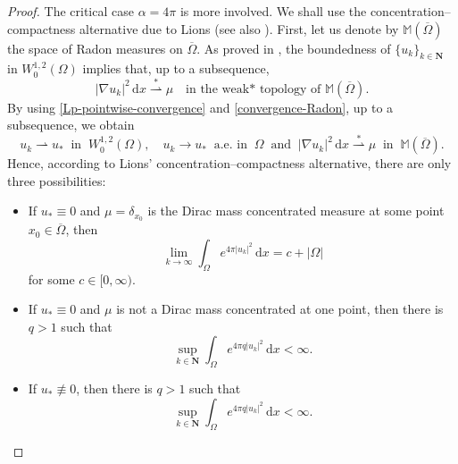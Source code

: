 \documentclass[reqno,11pt]{amsart}
\theoremstyle{definition}
\newcommand{\ud}{\,\mathrm{d}}
\begin{document}
\begin{proof}
      
    \noindent The critical case $\alpha=4\pi$ is more involved. We shall use the 
    concentration--compactness alternative due to Lions \cite{Lions85} (see also \cite{Cerny2013}). First, 
    let us denote by $\mathbb{M}(\overline{\Omega})$ the space of Radon measures on $\overline{\Omega}$.  
    As proved in \cite[Sec.~3, page~115]{MR2759829}, the boundedness of $\{u_k\}_{k\in\mathbf{N}}$ 
    in $W^{1,2}_0(\Omega)$ implies that, up to a subsequence, 
    \begin{equation}\label{convergence-Radon}
        |\nabla u_k|^2\ud x\overset{*}{\rightharpoonup} \mu \quad \text{in the weak* topology of  } 
        \mathbb{M}(\overline{\Omega}).
    \end{equation}
    By using \eqref{Lp-pointwise-convergence} and \eqref{convergence-Radon}, up to a subsequence,  we obtain
    \begin{equation}\label{Cerny-H}
        u_k \rightharpoonup u_*\;\; \text{in} \;\; W^{1,2}_0(\Omega),\quad u_k\to u_*\;\; 
        \text{a.e.\ in} \;\;\Omega\;\; \text{and} \;\;  |\nabla u_k|^2\ud x\overset{*}{\rightharpoonup} 
        \mu \;\; \text{in} \;\;\mathbb{M}(\overline{\Omega}).
    \end{equation}
   Hence, according to Lions' concentration--compactness alternative, there are only three possibilities:
   \begin{itemize}
        \item [(i)] If $u_*\equiv0$ and $\mu=\delta_{x_0}$ is the Dirac mass concentrated measure at 
        some point $x_0\in\overline{\Omega}$, then
        \begin{equation*}
            \lim_{k\to\infty}\int_{\Omega}e^{4\pi {|u_{k}|}^{2}} \ud x=c+|\Omega|
        \end{equation*}
        for some $c\in [0, \infty)$.
        \item [(ii)] If $u_*\equiv 0$ and $\mu$ is not a Dirac mass concentrated at one point, 
        then there is $q>1$ such that 
        \begin{equation*}
             \sup_{k\in\mathbf{N}}\int_{\Omega}e^{4\pi q{|u_{k}|}^{2}} \ud x<\infty.
        \end{equation*}
        \item [(iii)] If $u_*\not\equiv 0$, then there is $q>1$ such that
        \begin{equation*}
             \sup_{k\in\mathbf{N}}\int_{\Omega}e^{4\pi q{|u_{k}|}^{2}} \ud x<\infty.
        \end{equation*}
    \end{itemize}

\end{proof}
\end{document}
